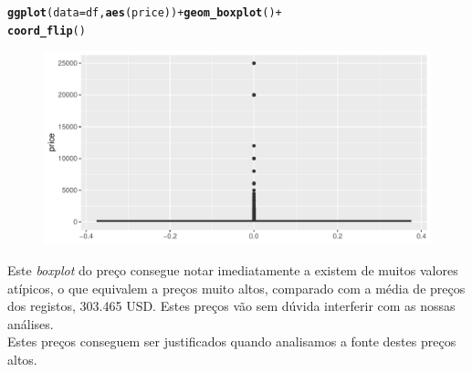 \documentclass[justified, 11pt]{scrartcl}\usepackage[]{graphicx}\usepackage[]{xcolor}
\makeatletter
\def\maxwidth{ %
  \ifdim\Gin@nat@width>\linewidth
    \linewidth
  \else
    \Gin@nat@width
  \fi
}
\newcommand{\hlopt}[1]{\textcolor[rgb]{0,0,0}{#1}}%
\newcommand{\hlstd}[1]{\textcolor[rgb]{0.345,0.345,0.345}{#1}}%
\newcommand{\hlkwc}[1]{\textcolor[rgb]{0.333,0.667,0.333}{#1}}%
\newcommand{\hlkwd}[1]{\textcolor[rgb]{0.737,0.353,0.396}{\textbf{#1}}}%
\newenvironment{kframe}{%
 \def\at@end@of@kframe{}%
 \ifinner\ifhmode%
  \def\at@end@of@kframe{\end{minipage}}%
  \begin{minipage}{\columnwidth}%
 \fi\fi%
 \def\FrameCommand##1{\hskip\@totalleftmargin \hskip-\fboxsep
 \colorbox{shadecolor}{##1}\hskip-\fboxsep
     \hskip-\linewidth \hskip-\@totalleftmargin \hskip\columnwidth}%
 \MakeFramed {\advance\hsize-\width
   \@totalleftmargin\z@ \linewidth\hsize
   \@setminipage}}%
 {\par\unskip\endMakeFramed%
 \at@end@of@kframe}
\newenvironment{knitrout}{}{} %
\makeatother
\begin{document}
\begin{knitrout}
\color{fgcolor}\begin{kframe}
\begin{alltt}
\hlkwd{ggplot}\hlstd{(}\hlkwc{data} \hlstd{= df,} \hlkwd{aes}\hlstd{(price))} \hlopt{+} \hlkwd{geom_boxplot}\hlstd{()} \hlopt{+}
    \hlkwd{coord_flip}\hlstd{()}
\end{alltt}
\end{kframe}\begin{figure}
\includegraphics[width=\maxwidth]{figure/chunk-priceBoxPlot-1} \end{figure}

\end{knitrout}
Este \textit{boxplot} do preço consegue notar imediatamente a existem de muitos valores atípicos, o que equivalem a preços muito altos, comparado com a média de preços dos registos, 303.465 USD. Estes preços vão sem dúvida interferir com as nossas análises. \\
Estes preços conseguem ser justificados quando analisamos a fonte destes preços altos.
\end{document}
